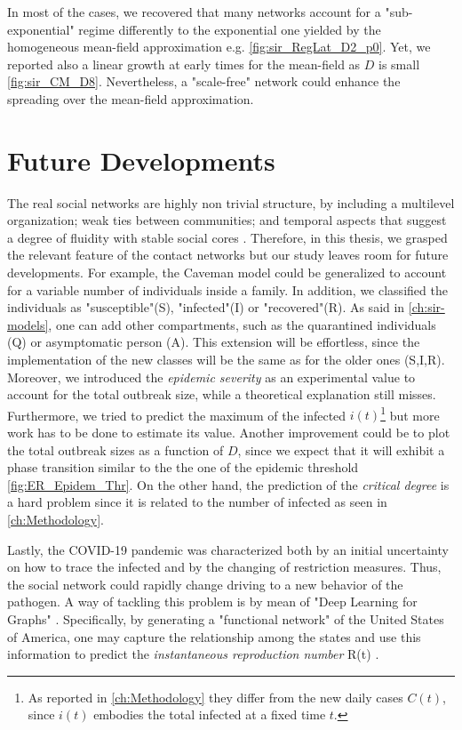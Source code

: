 \documentclass[a4paper,10pt, oneside]{book} %
\theoremstyle{definition}
\begin{document}
In most of the cases, we recovered that many networks account for a "sub-exponential" regime differently to the exponential one yielded by the homogeneous mean-field approximation e.g. \autoref{fig:sir_RegLat_D2_p0}. Yet, we reported also a linear growth at early times for the mean-field as $ D$ is small \autoref{fig:sir_CM_D8}. Nevertheless, a "scale-free" network could enhance the spreading over the mean-field approximation.

\section{Future Developments}
The real social networks are highly non trivial structure, by including a multilevel organization; weak ties between communities; and temporal aspects that suggest a degree of fluidity with stable social cores \cite{Thurner::NetBasedExpl}. Therefore, in this thesis, we grasped the relevant feature of the contact networks but our study leaves room for future developments. For example, the Caveman model could be generalized to account for a variable number of individuals inside a family. 
In addition, we classified the individuals as "susceptible"(S), "infected"(I) or "recovered"(R). As said in \autoref{ch:sir-models}, one can add other compartments, such as the quarantined individuals (Q) or asymptomatic person (A). This extension will be effortless, since the implementation of the new classes will be the same as for the older ones (S,I,R).
Moreover, we introduced the \textit{epidemic severity} as an experimental value to account for the total outbreak size, while a theoretical explanation still misses. Furthermore, we tried to predict the maximum of the infected $ i(t)$\footnote{As reported in \autoref{ch:Methodology} they differ from the new daily cases $ C(t)$, since $ i(t)$ embodies the total infected at a fixed time $ t$.} but more work has to be done to estimate its value. Another improvement could be to plot the total outbreak sizes as a function of $ D$, since we expect that it will exhibit a phase transition similar to the the one of the epidemic threshold \autoref{fig:ER_Epidem_Thr}. On the other hand, the prediction of the \textit{critical degree} is a hard problem since it is related to the number of infected as seen in \autoref{ch:Methodology}. 

Lastly, the COVID-19 pandemic was characterized both by an initial uncertainty on how to trace the infected and by the changing of restriction measures. Thus, the social network could rapidly change driving to a new behavior of the pathogen. A way of tackling this problem is by mean of "Deep Learning for Graphs" \cite{Bacciu_Micheli:2020_IntroDGNPisa}. Specifically, by generating a "functional network" of the United States of America, one may capture the relationship among the states and use this information to predict the \textit{instantaneous reproduction number} R(t) \cite{Davahli::USA_predicting_COVID19}.
\end{document}
